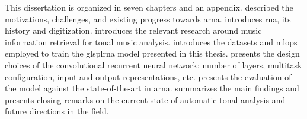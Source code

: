 
This dissertation is organized in seven chapters and an
appendix.  described the motivations,
challenges, and existing progress towards \gls{arna}.
 introduces
\gls{rna}, its history and digitization.
 introduces the relevant research around
music information retrieval for tonal music analysis.
 introduces the
datasets and \gls{mlops} employed to train the glspl{rna}
model presented in this thesis. 
presents the design choices of the convolutional recurrent
neural network: number of layers, multitask configuration,
input and output representations, etc.
 presents the evaluation of
the model against the state-of-the-art in \gls{arna}.
 summarizes the main findings and
presents closing remarks on the current state of automatic
tonal analysis and future directions in the field.
